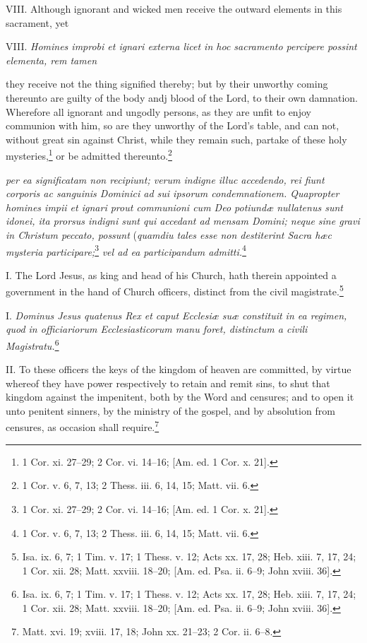 VIII. Although ignorant and wicked men receive the outward elements in this sacrament, yet

VIII. \emph{Homines improbi et ignari externa licet in hoc sacramento percipere possint elementa, rem tamen }

they receive not the thing signified thereby; but by their unworthy coming thereunto are guilty of the body andj blood of the Lord, to their own damnation. Wherefore all ignorant and ungodly persons, as they are unfit to enjoy communion with him, so are they unworthy of the Lord's table, and can not, without great sin against Christ, while they remain such, partake of these holy mysteries,\footnote{1 Cor. xi. 27–29; 2 Cor. vi. 14–16; [Am. ed. 1 Cor. x. 21].} or be admitted thereunto.\footnote{1 Cor. v. 6, 7, 13; 2 Thess. iii. 6, 14, 15; Matt. vii. 6.}

\emph{per ea significatam non recipiunt; verum indigne illuc accedendo, rei fiunt corporis ac sanguinis Dominici ad sui ipsorum condemnationem. Quapropter homines impii et ignari prout communioni cum Deo potiundæ nullatenus sunt idonei, ita prorsus indigni sunt qui accedant ad mensam Domini; neque sine gravi in Christum peccato, possunt }(\emph{quamdiu tales esse non destiterint Sacra hæc mysteria participare;}\footnote{1 Cor. xi. 27–29; 2 Cor. vi. 14–16; [Am. ed. 1 Cor. x. 21].}\emph{ vel ad ea participandum admitti.}\footnote{1 Cor. v. 6, 7, 13; 2 Thess. iii. 6, 14, 15; Matt. vii. 6.}


I. The Lord Jesus, as king and head of his Church, hath therein appointed a government in the hand of Church officers, distinct from the civil magistrate.\footnote{Isa. ix. 6, 7; 1 Tim. v. 17; 1 Thess. v. 12; Acts xx. 17, 28; Heb. xiii. 7, 17, 24; 1 Cor. xii. 28; Matt. xxviii. 18–20; [Am. ed. Psa. ii. 6–9; John xviii. 36].}

I. \emph{Dominus Jesus quatenus Rex et caput Ecclesiæ suæ constituit in ea regimen, quod in officiariorum Ecclesiasticorum manu foret, distinctum a civili Magistratu.}\footnote{Isa. ix. 6, 7; 1 Tim. v. 17; 1 Thess. v. 12; Acts xx. 17, 28; Heb. xiii. 7, 17, 24; 1 Cor. xii. 28; Matt. xxviii. 18–20; [Am. ed. Psa. ii. 6–9; John xviii. 36].}

II. To these officers the keys of the kingdom of heaven are committed, by virtue whereof they have power respectively to retain and remit sins, to shut that kingdom against the impenitent, both by the Word and censures; and to open it unto penitent sinners, by the ministry of the gospel, and by absolution from censures, as occasion shall require.\footnote{Matt. xvi. 19; xviii. 17, 18; John xx. 21–23; 2 Cor. ii. 6–8.}

